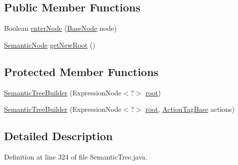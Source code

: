 \subsection*{Public Member Functions}
\begin{DoxyCompactItemize}
\item 
Boolean \hyperlink{classit_1_1emarolab_1_1cagg_1_1core_1_1evaluation_1_1semanticGrammar_1_1SemanticTree_1_1SemanticNode_1_1SemanticTreeBuilder_af221df96788914b0675c35e5bf5d9578}{enter\-Node} (\hyperlink{classit_1_1emarolab_1_1cagg_1_1core_1_1BaseNode}{Base\-Node} node)
\item 
\hyperlink{classit_1_1emarolab_1_1cagg_1_1core_1_1evaluation_1_1semanticGrammar_1_1SemanticTree_1_1SemanticNode}{Semantic\-Node} \hyperlink{classit_1_1emarolab_1_1cagg_1_1core_1_1evaluation_1_1semanticGrammar_1_1SemanticTree_1_1SemanticNode_1_1SemanticTreeBuilder_a353b543158befc012d2ca61814320382}{get\-New\-Root} ()
\end{DoxyCompactItemize}
\subsection*{Protected Member Functions}
\begin{DoxyCompactItemize}
\item 
\hyperlink{classit_1_1emarolab_1_1cagg_1_1core_1_1evaluation_1_1semanticGrammar_1_1SemanticTree_1_1SemanticNode_1_1SemanticTreeBuilder_a948f3a37b4b35fd8eeb861294d07fc60}{Semantic\-Tree\-Builder} (Expression\-Node$<$?$>$ \hyperlink{classit_1_1emarolab_1_1cagg_1_1core_1_1evaluation_1_1semanticGrammar_1_1SemanticTree_ab30b5997c372c3fe036d719a430d206e}{root})
\item 
\hyperlink{classit_1_1emarolab_1_1cagg_1_1core_1_1evaluation_1_1semanticGrammar_1_1SemanticTree_1_1SemanticNode_1_1SemanticTreeBuilder_a467fe9cf9a8a509ef294f14063f7a0dd}{Semantic\-Tree\-Builder} (Expression\-Node$<$?$>$ \hyperlink{classit_1_1emarolab_1_1cagg_1_1core_1_1evaluation_1_1semanticGrammar_1_1SemanticTree_ab30b5997c372c3fe036d719a430d206e}{root}, \hyperlink{classit_1_1emarolab_1_1cagg_1_1core_1_1evaluation_1_1semanticGrammar_1_1syntaxCompiler_1_1ActionTagBase}{Action\-Tag\-Base} actions)
\end{DoxyCompactItemize}


\subsection{Detailed Description}


Definition at line 324 of file Semantic\-Tree.\-java.



